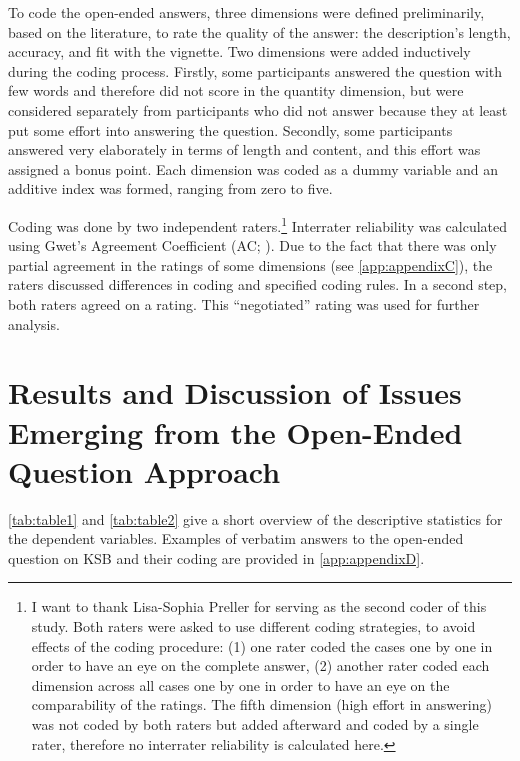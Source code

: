 \documentclass[twocolumn, serif, empirical, authordate]{jote-article}
\begin{document}
To code the open-ended answers, three dimensions were defined preliminarily, based on the literature, to rate the quality of the answer: the description's length, accuracy, and fit with the vignette.
Two dimensions were added inductively during the coding process.
Firstly, some participants answered the question with few words and therefore did not score in the quantity dimension, but were considered separately from participants who did not answer because they at least put some effort into answering the question. Secondly, some participants answered very elaborately in terms of length and content, and this effort was assigned a bonus point. Each dimension was coded as a dummy variable and an additive index was formed, ranging from zero to five.

Coding was done by two independent raters.\footnote{I want to thank Lisa-Sophia Preller for serving as the second coder of this study.
 Both raters were asked to use different coding strategies, to avoid effects of the coding procedure: (1) one rater coded the cases one by one in order to have an eye on the complete answer, (2) another rater coded each dimension across all cases one by one in order to have an eye on the comparability of the ratings. The fifth dimension (high effort in answering) was not coded by both raters but added afterward and coded by a single rater, therefore no interrater reliability is calculated here.} Interrater reliability was calculated using Gwet's Agreement Coefficient (AC; ). Due to the fact that there was only partial agreement in the ratings of some dimensions (see \autoref{app:appendixC}), the raters discussed differences in coding and specified coding rules. In a second step, both raters agreed on a rating. This ``negotiated'' rating was used for further analysis.


\section*{Results and Discussion of Issues Emerging from the Open-Ended Question Approach}
\label{sec:Results and Discussion of Issues Emerging from the Open-Ended Question Approach}

\autoref{tab:table1} and \autoref{tab:table2} give a short overview of the descriptive statistics for the dependent variables. Examples of verbatim answers to the open-ended question on KSB and their coding are provided in \autoref{app:appendixD}.
\end{document}
